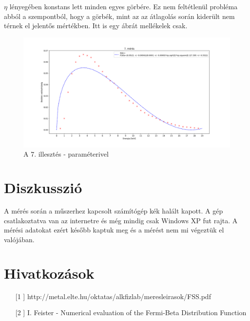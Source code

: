 \documentclass[12pt,a4paper]{article}
\theoremstyle{plain}
\begin{document}
\par $\eta$ lényegében konstans lett minden egyes görbére. Ez nem feltétlenül probléma
abból a szempontból, hogy a görbék, mint az az átlagolás során kiderült nem térnek
el jelentős mértékben. Itt is egy ábrát mellékelek csak.

\begin{figure}[H]
	\centering
	\includegraphics[width=0.95\linewidth ]{./atlagolt-gorbek-hibakkal-fermi6.png}
	\caption{A 7. illesztés - paraméterivel}
\end{figure}

\section{Diszkusszió}
\hspace*{10pt} A mérés során a műszerhez kapcsolt számítógép kék halált kapott.
A gép csatlakoztatva van az internetre és még mindig csak Windows XP fut rajta.
A mérési adatokat ezért később kaptuk meg és a mérést nem mi végeztük el valójában.

\newpage

\section*{Hivatkozások}
\begin{itemize}
	\item[[1]] {http://metal.elte.hu/oktatas/alkfizlab/meresleirasok/FSS.pdf}
	\item[[2]] {I. Feister - Numerical evaluation of the Fermi-Beta Distribution Function}

\end{itemize}
\end{document}
